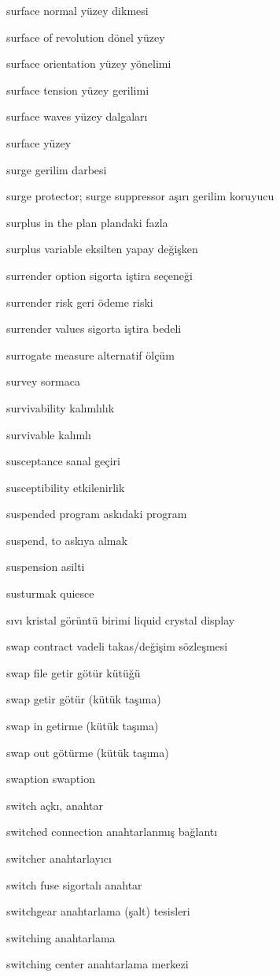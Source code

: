 \documentclass[12pt,fleqn]{article}\usepackage{../../common}
\begin{document}
surface normal yüzey dikmesi

surface of revolution dönel yüzey

surface orientation yüzey yönelimi

surface tension yüzey gerilimi

surface waves yüzey dalgaları

surface yüzey

surge gerilim darbesi

surge protector; surge suppressor aşırı gerilim koruyucu

surplus in the plan plandaki fazla

surplus variable eksilten yapay değişken

surrender option sigorta iştira seçeneği

surrender risk geri ödeme riski

surrender values sigorta iştira bedeli

surrogate measure alternatif ölçüm

survey sormaca

survivability kalımlılık

survivable kalımlı

susceptance sanal geçiri

susceptibility etkilenirlik

suspended program askıdaki program

suspend, to askıya almak

suspension asilti

susturmak quiesce

sıvı kristal görüntü birimi liquid crystal display

swap contract vadeli takas/değişim sözleşmesi

swap file getir götür kütüğü

swap getir götür (kütük taşıma)

swap in getirme (kütük taşıma)

swap out götürme (kütük taşıma)

swaption swaption

switch açkı, anahtar

switched connection anahtarlanmış bağlantı

switcher anahtarlayıcı

switch fuse sigortalı anahtar

switchgear anahtarlama (şalt) tesisleri

switching anahtarlama

switching center anahtarlama merkezi
\end{document}
